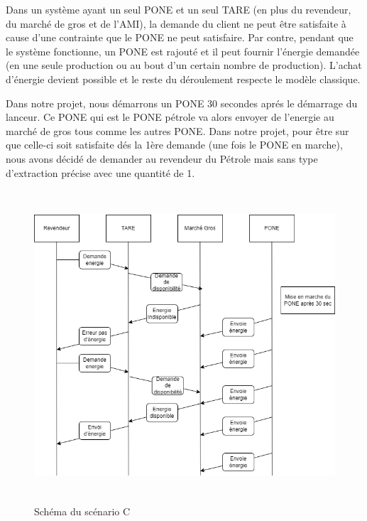 Dans un système ayant un seul PONE et un seul TARE (en plus du revendeur, du marché de gros et de l'AMI), la demande du client ne peut être satisfaite à cause d'une contrainte que le PONE ne peut satisfaire. Par contre, pendant que le système fonctionne, un PONE est rajouté et il peut fournir l'énergie demandée (en une seule production ou au bout d'un certain nombre de production). L'achat d'énergie devient possible et le reste du déroulement respecte le modèle classique.

Dans notre projet, nous démarrons un PONE 30 secondes aprés le démarrage du lanceur. Ce PONE qui est le PONE pétrole va alors envoyer de l'energie au marché de gros tous comme les autres PONE.
Dans notre projet, pour être sur que celle-ci soit satisfaite dés la 1ère demande (une fois le PONE en marche), nous avons décidé de demander au revendeur du Pétrole mais sans type d'extraction précise avec une quantité de 1.


\begin{figure}[h]
    \centering
    \includegraphics[width=134mm, height=116mm]{images/ScenarioC.png}
    \caption{Schéma du scénario C}
    \label{img:mesh24}
\end{figure}
\newpage